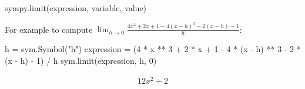 \begin{pyin}
sympy.limit(expression, variable, value)
\end{pyin}



For example to compute \(\lim_{h \to 0} \frac{4 x ^ 3 + 2 x + 1 - 4(x - h)^3 - 2(x - h) - 1}{h}\):




\begin{pyin}
h = sym.Symbol("h")
expression = (4 * x ** 3 + 2 * x + 1 - 4 * (x - h) ** 3 - 2 * (x - h) - 1) / h
sym.limit(expression, h, 0)
\end{pyin}




\begin{equation*}
\begin{split}\displaystyle 12 x^{2} + 2\end{split}
\end{equation*}






